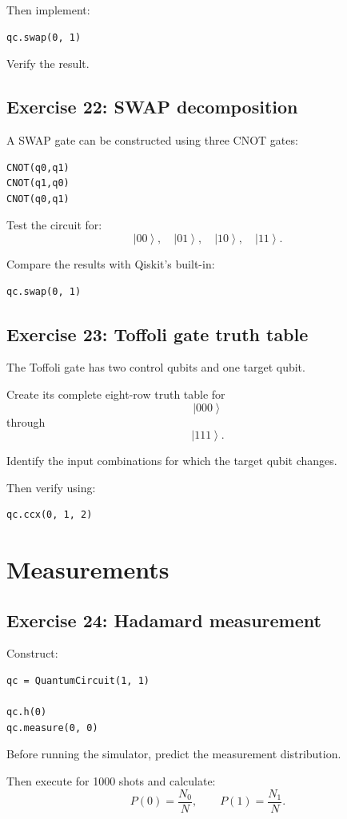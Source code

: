 \documentclass[12pt,a4paper]{article}
\newcommand{\ket}[1]{\left|#1\right\rangle}
\begin{document}
Then implement:
\begin{lstlisting}
qc.swap(0, 1)
\end{lstlisting}

Verify the result.

\subsection*{Exercise 22: SWAP decomposition}
A SWAP gate can be constructed using three CNOT gates:
\begin{lstlisting}
CNOT(q0,q1)
CNOT(q1,q0)
CNOT(q0,q1)
\end{lstlisting}

Test the circuit for:
\[
\ket{00},\quad \ket{01},\quad \ket{10},\quad \ket{11}.
\]

Compare the results with Qiskit's built-in:
\begin{lstlisting}
qc.swap(0, 1)
\end{lstlisting}

\subsection*{Exercise 23: Toffoli gate truth table}
The Toffoli gate has two control qubits and one target qubit.

Create its complete eight-row truth table for
\[
\ket{000}
\]
through
\[
\ket{111}.
\]

Identify the input combinations for which the target qubit changes.

Then verify using:
\begin{lstlisting}
qc.ccx(0, 1, 2)
\end{lstlisting}

\section{Measurements}

\subsection*{Exercise 24: Hadamard measurement}
Construct:
\begin{lstlisting}
qc = QuantumCircuit(1, 1)

qc.h(0)
qc.measure(0, 0)
\end{lstlisting}

Before running the simulator, predict the measurement distribution.

Then execute for 1000 shots and calculate:
\[
P(0)=\frac{N_0}{N},
\qquad
P(1)=\frac{N_1}{N}.
\]
\end{document}
